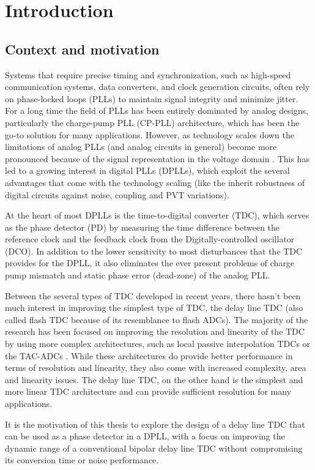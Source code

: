 \chapter{Introduction}
\section{Context and motivation}
Systems that require precise timing and synchronization, such as high-speed communication systems, data converters, and clock generation circuits, often rely on phase-locked loops (PLLs) to maintain
signal integrity and minimize jitter. For a long time the field of PLLs has been entirely dominated by analog designs, particularly the charge-pump PLL (CP-PLL) architecture, which has been the go-to
solution for many applications. However, as technology scales down the limitations of analog PLLs (and analog circuits in general) become more pronounced because of the signal representation
in the voltage domain \cite{Henzler2010}. This has led to a growing interest in digital PLLs (DPLLs), which exploit the several advantages that come with the technology scaling (like the inherit robustness of
digital circuits against noise, coupling and PVT variations).

At the heart of most DPLLs is the time-to-digital converter (TDC), which serves as the phase detector (PD) by measuring the time difference between the reference clock and the feedback clock from the
Digitally-controlled oscillator (DCO). In addition to the lower sensitivity to most disturbances that the TDC provides for the DPLL, it also eliminates the ever present problems of charge pump mismatch
and static phase error (dead-zone) of the analog PLL.

Between the several types of TDC developed in recent years, there hasn't been much interest in improving the simplest type of TDC, the delay line TDC (also called flash TDC because of its resemblance to flash ADCs).
The majority of the research has been focused on improving the resolution and linearity of the TDC by using more complex architectures, such as local passive interpolation TDCs \cite{Mantyniemi2009} or the TAC-ADCs
\cite{Kratyuk2006}. While these architectures do provide better performance in terms of resolution and linearity, they also come with increased complexity, area and linearity issues. The delay line TDC, on the
other hand is the simplest and more linear TDC architecture and can provide sufficient resolution for many applications. 

It is the motivation of this thesis to explore the design of a delay line TDC that can be used as a phase detector in a DPLL, with a focus on improving the dynamic range of a conventional bipolar delay line TDC without
compromising its conversion time or noise performance.

